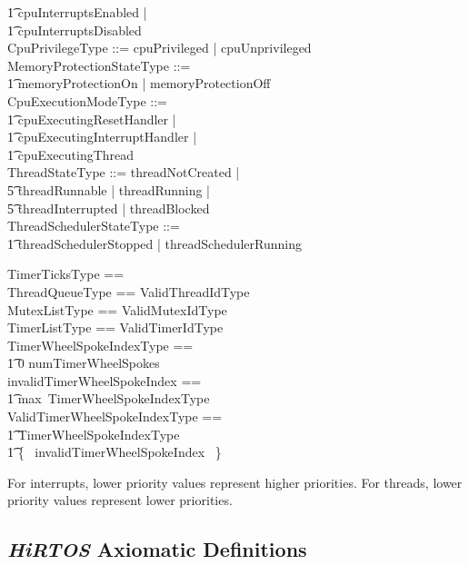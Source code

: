 \documentclass[11pt,letterpaper,twoside,openany]{book}
\begin{document}
\begin{zed}
    \t1 cpuInterruptsEnabled | \\
    \t1 cpuInterruptsDisabled \\
    CpuPrivilegeType ::= cpuPrivileged | cpuUnprivileged \\
    MemoryProtectionStateType ::= \\
    \t1 memoryProtectionOn | memoryProtectionOff \\
    CpuExecutionModeType ::= \\
    \t1 cpuExecutingResetHandler | \\
    \t1 cpuExecutingInterruptHandler | \\
    \t1 cpuExecutingThread \\
    ThreadStateType ::= threadNotCreated | \\
    \t5 threadRunnable | threadRunning | \\
    \t5 threadInterrupted | threadBlocked \\
    ThreadSchedulerStateType ::= \\
    \t1 threadSchedulerStopped | threadSchedulerRunning \\
\end{zed}

\begin{zed}
    TimerTicksType == \nat \\
    ThreadQueueType == \iseq ValidThreadIdType \\
    MutexListType == \iseq ValidMutexIdType \\
    TimerListType == \iseq ValidTimerIdType \\
    TimerWheelSpokeIndexType == \\
    \t1 0 \upto numTimerWheelSpokes \\
    invalidTimerWheelSpokeIndex == \\
    \t1 max~TimerWheelSpokeIndexType \\
    ValidTimerWheelSpokeIndexType == \\
    \t1 TimerWheelSpokeIndexType ~\setminus \\
    \t1 \{~ invalidTimerWheelSpokeIndex ~\} \\
\end{zed}

For interrupts, lower priority values represent higher priorities. For threads, lower priority
values represent lower priorities.

\subsection{\emph{HiRTOS} Axiomatic Definitions}
\end{document}
